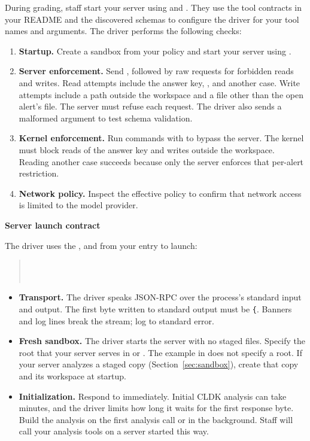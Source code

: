 \documentclass[9pt,letterpaper]{article}
\begin{document}
During grading, staff start your server using  and
. They use the tool contracts in your README and the discovered
schemas to configure the driver for your tool names and arguments. The driver
performs the following checks:
\begin{enumerate}
\item \textbf{Startup.} Create a sandbox from your policy and start your server
  using .
\item \textbf{Server enforcement.} Send , followed by raw
   requests for forbidden reads and writes. Read attempts include
  the answer key, , and another case. Write attempts include a path
  outside the workspace and a file other than the open alert's file. The server
  must refuse each request. The driver also sends a malformed argument to test
  schema validation.
\item \textbf{Kernel enforcement.} Run commands with
   to bypass the server. The kernel must block reads
  of the answer key and writes outside the workspace. Reading another case
  succeeds because only the server enforces that per-alert restriction.
\item \textbf{Network policy.} Inspect the effective policy to confirm that
  network access is limited to the model provider.
\end{enumerate}

\textbf{Server launch contract}

The driver uses the ,  and  from your
 entry to launch:
\begin{quote}
\\
\\
\end{quote}

\begin{itemize}
\item \textbf{Transport.} The driver speaks JSON-RPC over the process's standard
  input and output. The first byte written to standard output must be \verb|{|.
  Banners and log lines break the stream; log to standard error.
\item \textbf{Fresh sandbox.} The driver starts the server with no staged files.
  Specify the root that your server serves in  or .
  The example in  does not specify a root.
  If your server analyzes a staged copy (Section~\ref{sec:sandbox}), create that
  copy and its workspace at startup.
\item \textbf{Initialization.} Respond to  immediately. Initial
  CLDK analysis can take minutes, and the driver limits how long it waits for
  the first response byte. Build the analysis on the first analysis call or in
  the background. Staff will call your analysis tools on a server started this way.
\end{itemize}
\end{document}
